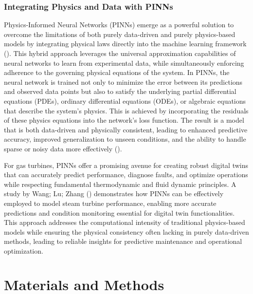 \documentclass[
  12pt,
  oneside,
  a4paper,
  english,
  brazil]{abntex2}
\begin{document}
\subsection{Integrating Physics and Data with
PINNs}\label{integrating-physics-and-data-with-pinns}

Physics-Informed Neural Networks (PINNs) emerge as a powerful solution
to overcome the limitations of both purely data-driven and purely
physics-based models by integrating physical laws directly into the
machine learning framework (). This hybrid approach leverages the
universal approximation capabilities of neural networks to learn from
experimental data, while simultaneously enforcing adherence to the
governing physical equations of the system. In PINNs, the neural network
is trained not only to minimize the error between its predictions and
observed data points but also to satisfy the underlying partial
differential equations (PDEs), ordinary differential equations (ODEs),
or algebraic equations that describe the system's physics. This is
achieved by incorporating the residuals of these physics equations into
the network's loss function. The result is a model that is both
data-driven and physically consistent, leading to enhanced predictive
accuracy, improved generalization to unseen conditions, and the ability
to handle sparse or noisy data more effectively
().

For gas turbines, PINNs offer a promising avenue for creating robust
digital twins that can accurately predict performance, diagnose faults,
and optimize operations while respecting fundamental thermodynamic and
fluid dynamic principles. A study by Wang; Lu; Zhang
() demonstrates how PINNs can be
effectively employed to model steam turbine performance, enabling more
accurate predictions and condition monitoring essential for digital twin
functionalities. This approach addresses the computational intensity of
traditional physics-based models while ensuring the physical consistency
often lacking in purely data-driven methods, leading to reliable
insights for predictive maintenance and operational optimization.

\chapter{\textbf{Materials and Methods}}
\end{document}
